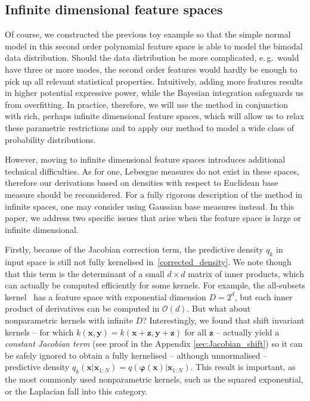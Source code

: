 \documentclass[twoside]{article}
\newcommand{\eg}{e.\,g.\ }
\begin{document}
\subsection{Infinite dimensional feature spaces \label{sec:infinite_dimensional}}

Of course, we constructed the previous toy example so that the simple normal model in this second order polynomial feature space is able to model the bimodal data distribution. Should the data distribution be more complicated, \eg would have three or more modes, the second order features would hardly be enough to pick up all relevant statistical properties. Intuitively, adding more features results in higher potential expressive power, while the Bayesian integration safeguards us from overfitting. In practice, therefore, we will use the method in conjunction with rich, perhaps infinite dimensional feature spaces, which will allow us to relax these parametric restrictions and to apply our method to model a wide class of probability distributions.

However, moving to infinite dimensional feature spaces introduces additional technical difficulties. As for one, Lebesgue measures do not exist in these spaces, therefore our derivations based on densities with respect to Euclidean base measure should be reconsidered. For a fully rigorous description of the method in infinite spaces, one may consider using Gaussian base measures instead. In this paper, we address two specific issues that arise when the feature space is large or infinite dimensional.

Firstly, because of the Jacobian correction term, the predictive density $q_k$ in input space is still not fully kernelised in~\eqref{corrected_density}. We note though that this term is the determinant of a small $d\times d$ matrix of inner products, which can actually be computed efficiently for some kernels. For example, the all-subsets kernel~\cite{Cristianini2004} has a feature space with exponential dimension $D=2^d$, but each inner product of derivatives can be computed in $\mathcal{O}(d)$. But what about nonparametric kernels with infinite $D$? Interestingly, we found that shift invariant kernels -- for which $k(\bm{x},\bm{y}) = k(\bm{x}+\bm{z},\bm{y}+\bm{z})$ for all $\bm{z}$ -- actually yield a \emph{constant Jacobian term} (see proof in the Appendix \ref{sec:Jacobian_shift}) so it can be safely ignored to obtain a fully kernelised -- although unnormalised -- predictive density $q_k(\bm{x} \vert \bm{x}_{1:N}) = q(\bm{\varphi}(\bm{x})\vert\bm{x}_{1:N})$. %
This result is important, as the most commonly used nonparametric kernels, such as the squared exponential, or the Laplacian fall into this category.
\end{document}
